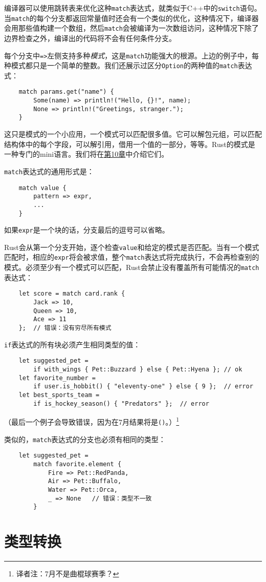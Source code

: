 编译器可以使用跳转表来优化这种\texttt{match}表达式，就类似于C++中的\texttt{switch}语句。当\texttt{match}的每个分支都返回常量值时还会有一个类似的优化，这种情况下，编译器会用那些值构建一个数组，然后\texttt{match}会被编译为一次数组访问，这种情况下除了边界检查之外，编译出的代码将不会有任何条件分支。

每个分支中\texttt{=>}左侧支持多种\emph{模式}，这是\texttt{match}功能强大的根源。上边的例子中，每种模式都只是一个简单的整数。我们还展示过区分\texttt{Option}的两种值的\texttt{match}表达式：
\begin{verbatim}
    match params.get("name") {
        Some(name) => println!("Hello, {}!", name);
        None => println!("Greetings, stranger.");
    }
\end{verbatim}

这只是模式的一个小应用，一个模式可以匹配很多值。它可以解包元组，可以匹配结构体中的每个字段，可以解引用，借用一个值的一部分，等等。Rust的模式是一种专门的mini语言。我们将在\hyperref[ch10]{第10章}中介绍它们。

\texttt{match}表达式的通用形式是：
\begin{verbatim}
    match value {
        pattern => expr,
        ...
    }
\end{verbatim}
如果\texttt{expr}是一个块的话，分支最后的逗号可以省略。

Rust会从第一个分支开始，逐个检查\texttt{value}和给定的模式是否匹配。当有一个模式匹配时，相应的\texttt{expr}将会被求值，整个\texttt{match}表达式将完成执行，不会再检查别的模式。必须至少有一个模式可以匹配，Rust会禁止没有覆盖所有可能情况的\texttt{match}表达式：
\begin{verbatim}
    let score = match card.rank {
        Jack => 10,
        Queen => 10,
        Ace => 11
    };  // 错误：没有穷尽所有模式
\end{verbatim}

\texttt{if}表达式的所有块必须产生相同类型的值：
\begin{verbatim}
    let suggested_pet = 
        if with_wings { Pet::Buzzard } else { Pet::Hyena }; // ok
    let favorite_number =
        if user.is_hobbit() { "eleventy-one" } else { 9 };  // error
    let best_sports_team = 
        if is_hockey_season() { "Predators" };  // error
\end{verbatim}
（最后一个例子会导致错误，因为在7月结果将是\texttt{()}。）\footnote{译者注：7月不是曲棍球赛季？}

类似的，\texttt{match}表达式的分支也必须有相同的类型：
\begin{verbatim}
    let suggested_pet =
        match favorite.element {
            Fire => Pet::RedPanda,
            Air => Pet::Buffalo,
            Water => Pet::Orca,
            _ => None   // 错误：类型不一致
        }
\end{verbatim}

\section{类型转换}\label{cast}
